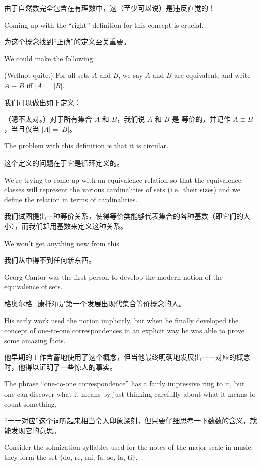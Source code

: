 由于自然数完全包含在有理数中，这（至少可以说）是违反直觉的！

Coming up with the ``right'' definition for this concept is crucial.

为这个概念找到“正确”的定义至关重要。

We could make the following:
\begin{defi}
    (Well\textellipsis not quite.) For all sets $A$ and $B$, we say $A$ and $B$ are
    equivalent, and write $A \equiv B$ iff $|A|
        = |B|$.
\end{defi}

我们可以做出如下定义：
\begin{defi}
    （嗯\textellipsis 不太对。）对于所有集合 $A$ 和 $B$，我们说 $A$ 和 $B$ 是
    等价的，并记作 $A \equiv B$，当且仅当 $|A|
        = |B|$。
\end{defi}

The problem with this definition is that it is circular.

这个定义的问题在于它是循环定义的。

We're trying to
come up with an equivalence relation so that the equivalence classes will
represent the various cardinalities of sets (i.e.\ their sizes) and we
define the relation in terms of cardinalities.

我们试图提出一种等价关系，使得等价类能够代表集合的各种基数（即它们的大小），而我们却用基数来定义这种关系。

We won't get anything new
from this.

我们从中得不到任何新东西。

Georg Cantor was the first person to develop the modern notion of the
equivalence of sets.

格奥尔格·康托尔是第一个发展出现代集合等价概念的人。

His early work used the notion implicitly, but when he
finally developed the concept of one-to-one correspondences in an explicit
way he was able to prove some amazing facts.

他早期的工作含蓄地使用了这个概念，但当他最终明确地发展出一一对应的概念时，他得以证明了一些惊人的事实。

The phrase ``one-to-one correspondence''
has a fairly impressive ring to it, but one can discover what it
means by just thinking carefully about what it means to count something.

“一一对应”这个词听起来相当令人印象深刻，但只要仔细思考一下数数的含义，就能发现它的意思。

Consider the solmization syllables used for the notes of the major scale
in music;
they form the set $\{\mbox{do, re, mi, fa, so, la, ti}\}$.

